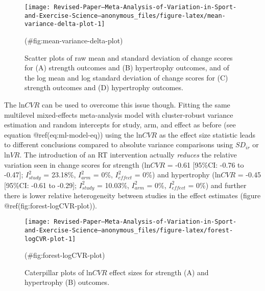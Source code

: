 \documentclass[
]{article}
\begin{document}
\begin{figure}

{\centering \texttt{[image: Revised-Paper---Meta-Analysis-of-Variation-in-Sport-and-Exercise-Science---anonymous\_files/figure-latex/mean-variance-delta-plot-1]} 

}

\caption{Scatter plots of raw mean and standard deviation of change scores for (A) strength outcomes and (B) hypertrophy outcomes, and of the log mean and log standard deviation of change scores for (C) strength outcomes and (D) hypertrophy outcomes.}(\#fig:mean-variance-delta-plot)
\end{figure}

The \(\textrm{ln}CVR\) can be used to overcome this issue though. Fitting the same multilevel mixed-effects meta-analysis model with cluster-robust variance estimation and random intercepts for study, arm, and effect as before (see equation @ref(eq:ml-model-eq)) using the \(\textrm{ln}CVR\) as the effect size statistic leads to different conclusions compared to absolute variance comparisons using \(SD_{ir}\) or \(\textrm{ln}VR\). The introduction of an RT intervention actually \emph{reduces} the relative variation seen in change scores for strength (\(\textrm{ln}CVR\) = -0.61 {[}95\%CI: -0.76 to -0.47{]}; \(I^2_{study}\) = 23.18\%, \(I^2_{arm}\) = 0\%, \(I^2_{effect}\) = 0\%) and hypertrophy (\(\textrm{ln}CVR\) = -0.45 {[}95\%CI: -0.61 to -0.29{]}; \(I^2_{study}\) = 10.03\%, \(I^2_{arm}\) = 0\%, \(I^2_{effect}\) = 0\%) and further there is lower relative heterogeneity between studies in the effect estimates (figure @ref(fig:forest-logCVR-plot)).

\begin{figure}

{\centering \texttt{[image: Revised-Paper---Meta-Analysis-of-Variation-in-Sport-and-Exercise-Science---anonymous\_files/figure-latex/forest-logCVR-plot-1]} 

}

\caption{Caterpillar plots of ln$CVR$ effect sizes for strength (A) and hypertrophy (B) outcomes.}(\#fig:forest-logCVR-plot)
\end{figure}
\end{document}
